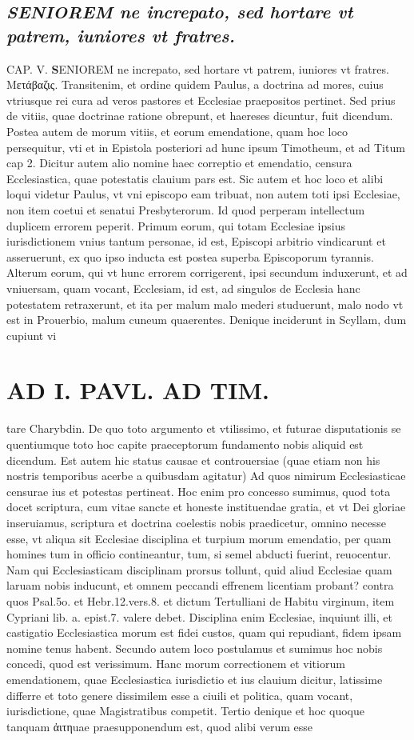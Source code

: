 \documentclass{article}
\begin{document}
\begin{pages}
\subsection*{\textit{SENIOREM ne increpato, sed hortare vt patrem, iuniores vt fratres.}}CAP. V. 
\textbf{S}ENIOREM ne increpato, sed hortare vt patrem, iuniores vt fratres. Μετάβαζις. Transitenim, et ordine quidem Paulus, a doctrina ad mores, cuius vtriusque rei cura ad veros pastores et Ecclesiae praepositos pertinet. Sed prius de vitiis, quae doctrinae ratione obrepunt, et haereses dicuntur, fuit dicendum. Postea autem de morum vitiis, et eorum emendatione, quam hoc loco persequitur, vti et in Epistola posteriori ad hunc ipsum Timotheum, et ad Titum cap 2. Dicitur autem alio nomine haec correptio et emendatio, censura Ecclesiastica, quae potestatis clauium pars est. Sic autem et hoc loco et alibi loqui videtur Paulus, vt vni episcopo eam tribuat, non autem toti ipsi Ecclesiae, non item coetui et senatui Presbyterorum. Id quod perperam intellectum duplicem errorem peperit. Primum eorum, qui totam Ecclesiae ipsius iurisdictionem vnius tantum personae, id est, Episcopi arbitrio vindicarunt et asseruerunt, ex quo ipso inducta est postea superba Episcoporum tyrannis. Alterum eorum, qui vt hunc errorem corrigerent, ipsi secundum induxerunt, et ad vniuersam, quam vocant, Ecclesiam, id est, ad singulos de Ecclesia hanc potestatem retraxerunt, et ita per malum malo mederi studuerunt, malo nodo vt est in Prouerbio, malum cuneum quaerentes. Denique inciderunt in Scyllam, dum cupiunt vi\pend
\section*{AD I. PAVL. AD TIM. }
\marginpar{[ p.240 ]}\pstart tare Charybdin. De quo toto argumento et vtilissimo, et futurae disputationis se quentiumque toto hoc capite praeceptorum fundamento nobis aliquid est dicendum. Est autem hic status causae et controuersiae (quae etiam non his nostris temporibus acerbe a quibusdam agitatur) Ad quos nimirum Ecclesiasticae censurae ius et potestas pertineat. Hoc enim pro concesso sumimus, quod tota docet scriptura, cum vitae sancte et honeste instituendae gratia, et vt Dei gloriae inseruiamus, scriptura et doctrina coelestis nobis praedicetur, omnino necesse esse, vt aliqua sit Ecclesiae disciplina et turpium morum emendatio, per quam homines tum in officio contineantur, tum, si semel abducti fuerint, reuocentur. Nam qui Ecclesiasticam disciplinam prorsus tollunt, quid aliud Ecclesiae quam laruam nobis inducunt, et omnem peccandi effrenem licentiam probant? contra quos Psal.5o. et Hebr.12.vers.8. et dictum Tertulliani de Habitu virginum, item Cypriani lib.  a. epist.7. valere debet. Disciplina enim Ecclesiae, inquiunt illi, et castigatio Ecclesiastica morum est fidei custos, quam qui repudiant, fidem ipsam nomine tenus habent. Secundo autem loco postulamus et sumimus hoc nobis concedi, quod est verissimum. Hanc morum correctionem et vitiorum emendationem, quae Ecclesiastica iurisdictio et ius clauium dicitur, latissime differre et toto genere dissimilem esse a ciuili et politica, quam vocant, iurisdictione, quae Magistratibus competit. Tertio denique et hoc quoque tanquam ἀιτηuae praesupponendum est, quod alibi verum esse  \pend

\end{pages}
\end{document}
